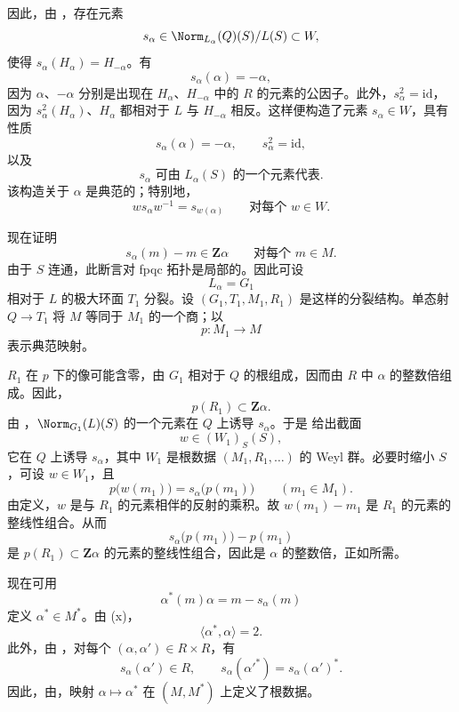 因此，由 ，存在元素
\[
 s_\alpha\in\Norm_{L_\alpha}(Q)(S)/L(S)\subset W,
\]
使得 \(s_\alpha(H_\alpha)=H_{-\alpha}\)。有
\[
 s_\alpha(\alpha)=-\alpha,
\]
因为 \(\alpha\)、\(-\alpha\) 分别是出现在 \(H_\alpha\)、\(H_{-\alpha}\) 中的 \(R\) 的元素的公因子。此外，\(s_\alpha^2=\mathrm{id}\)，因为 \(s_\alpha^2(H_\alpha)\)、\(H_\alpha\) 都相对于 \(L\) 与 \(H_{-\alpha}\) 相反。这样便构造了元素 \(s_\alpha\in W\)，具有性质
\[
\tag{x}\label{sga3:xxvi:subsection:7-4-2:equation:x}
 s_\alpha(\alpha)=-\alpha,\qquad s_\alpha^2=\mathrm{id},
\]
以及
\[
\tag{xx}\label{sga3:xxvi:subsection:7-4-2:equation:xx}
 s_\alpha\text{ 可由 }L_\alpha(S)\text{ 的一个元素代表}.
\]
该构造关于 \(\alpha\) 是典范的；特别地，
\[
\tag{xxx}\label{sga3:xxvi:subsection:7-4-2:equation:xxx}
 w s_\alpha w^{-1}=s_{w(\alpha)}
 \qquad\text{对每个 }w\in W.
\]


现在证明
\[
\tag{xxxx}\label{sga3:xxvi:subsection:7-4-3:equation:xxxx}
 s_\alpha(m)-m\in\mathbf Z\alpha
 \qquad\text{对每个 }m\in M.
\]
由于 \(S\) 连通，此断言对 fpqc 拓扑是局部的。因此可设
\[
 L_\alpha=G_1
\]
相对于 \(L\) 的极大环面 \(T_1\) 分裂。设 \((G_1,T_1,M_1,R_1)\) 是这样的分裂结构。单态射 \(Q\to T_1\) 将 \(M\) 等同于 \(M_1\) 的一个商；以
\[
 p:M_1\longrightarrow M
\]
表示典范映射。

\(R_1\) 在 \(p\) 下的像可能含零，由 \(G_1\) 相对于 \(Q\) 的根组成，因而由 \(R\) 中 \(\alpha\) 的整数倍组成。因此，
\[
 p(R_1)\subset\mathbf Z\alpha.
\]
由 \textup{}，\(\Norm_{G_1}(L)(S)\) 的一个元素在 \(Q\) 上诱导 \(s_\alpha\)。于是 给出截面
\[
 w\in(W_1)_S(S),
\]
它在 \(Q\) 上诱导 \(s_\alpha\)，其中 \(W_1\) 是根数据 \((M_1,R_1,\ldots)\) 的 Weyl 群。必要时缩小 \(S\)，可设 \(w\in W_1\)，且
\[
 p\bigl(w(m_1)\bigr)=s_\alpha\bigl(p(m_1)\bigr)
 \qquad(m_1\in M_1).
\]
由定义，\(w\) 是与 \(R_1\) 的元素相伴的反射的乘积。故 \(w(m_1)-m_1\) 是 \(R_1\) 的元素的整线性组合。从而
\[
 s_\alpha\bigl(p(m_1)\bigr)-p(m_1)
\]
是 \(p(R_1)\subset\mathbf Z\alpha\) 的元素的整线性组合，因此是 \(\alpha\) 的整数倍，正如所需。


现在可用
\[
 \alpha^*(m)\alpha=m-s_\alpha(m)
\]
定义 \(\alpha^*\in M^*\)。由 \textup{(x)}，
\[
 \langle\alpha^*,\alpha\rangle=2.
\]
此外，由 \textup{}，对每个 \((\alpha,\alpha')\in R\times R\)，有
\[
 s_\alpha(\alpha')\in R,\qquad
 s_\alpha(\alpha'^*)=s_\alpha(\alpha')^*.
\]
因此，由，映射 \(\alpha\mapsto\alpha^*\) 在 \((M,M^*)\) 上定义了根数据。

